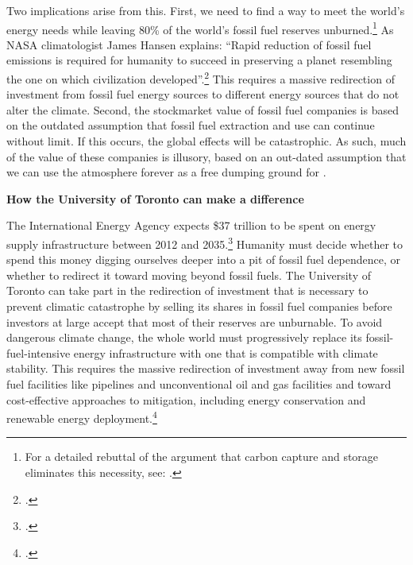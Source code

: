 Two implications arise from this. 
First, we need to find a way to meet the world's energy needs while leaving 80\% of the world's fossil fuel reserves unburned.\footnote{For a detailed rebuttal of the argument that carbon capture and storage eliminates this necessity, see: .} 
As NASA climatologist James Hansen explains: ``Rapid reduction of fossil fuel emissions is required for humanity to
succeed in preserving a planet resembling the one on which civilization developed''.\footcite[][]{HansenPaleo}
This requires a massive redirection of investment from fossil fuel energy sources to different energy sources that do not alter the climate.
Second, the stockmarket value of fossil fuel companies is based on the outdated assumption that fossil fuel extraction and use can continue without limit.
If this occurs, the global effects will be catastrophic.
As such, much of the value of these companies is illusory, based on an out-dated assumption that we can use the atmosphere forever as a free dumping ground for .



\textbf{How the University of Toronto can make a difference}



The International Energy Agency expects \$37 trillion to be spent on energy supply infrastructure between 2012 and 2035.\footcite[][]{IEA2012factsheet}
Humanity must decide whether to spend this money digging ourselves deeper into a pit of fossil fuel dependence, or whether to redirect it toward moving beyond fossil fuels.
The University of Toronto can take part in the redirection of investment that is necessary to prevent climatic catastrophe by selling its shares in fossil fuel companies before investors at large accept that most of their reserves are unburnable.
To avoid dangerous climate change, the whole world must progressively replace its fossil-fuel-intensive energy infrastructure with one that is compatible with climate stability.
This requires the massive redirection of investment away from new fossil fuel facilities like pipelines and unconventional oil and gas facilities and toward cost-effective approaches to  mitigation, including energy conservation and renewable energy deployment.\footcite[The consultancy McKinsey \& Company has studied and ranked global mitigation options, in terms of their cost, plausible deployment speed, and their capacity to mitigate greenhouse gas pollution. See: ][p. 8]{McKinseyCurve}



